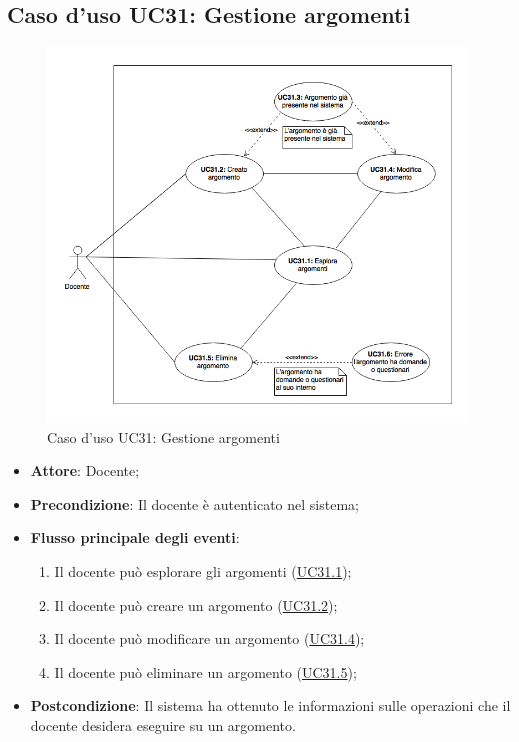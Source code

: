 \documentclass[12pt,a4paper]{article}
\begin{document}
\subsection{Caso d'uso UC31: Gestione argomenti}
\begin{figure}[H]
	\centering
	\includegraphics[width=\textwidth]{diagramUC31.png}
	\caption{Caso d'uso UC31: Gestione argomenti}\label{fig:UC31} 
\end{figure}
\begin{itemize}

\item \textbf{Attore}: Docente; 
\item \textbf{Precondizione}: Il docente è autenticato nel sistema;

\item \textbf{Flusso principale degli eventi}:
\begin{enumerate}
	\item Il docente può esplorare gli argomenti (\hyperlink{UC31.1}{UC31.1});
	\item Il docente può creare un argomento (\hyperlink{UC31.2}{UC31.2});
	\item Il docente può modificare un argomento (\hyperlink{UC31.4}{UC31.4});
	\item Il docente può eliminare un argomento (\hyperlink{UC31.5}{UC31.5});
	
\end{enumerate}
\item \textbf{Postcondizione}: Il sistema ha ottenuto le informazioni sulle operazioni che il docente desidera eseguire su un argomento.
\end{itemize}
\hypertarget{UC31.1}{}
\end{document}
